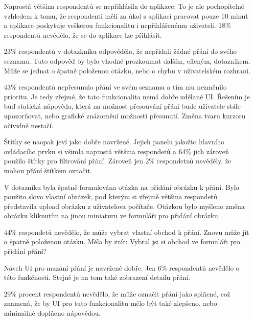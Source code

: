 Naprostá většína respondentů se nepřihlásila do aplikace. To je ale pochopitelné vzhledem k tomu, že respondenti měli za úkol s aplikací pracovat pouze 10 minut a aplikace poskytuje veškerou funkcionalitu i nepřihlášenému uživateli. 18\% respondentů nevědělo, že se do aplikace lze přihlásit.

23\% respondentů v dotazkníku odpovědělo, že nepřidali žádné přání do svého seznamu. Tuto odpověď by bylo vhodné prozkoumat dalším, cíleným, dotazníkem. Může se jednat o špatně položenou otázku, nebo o chybu v uživatelském rozhraní.

43\% respondentů nepřesunulo přání ve svém seznamu a tím mu nezměnilo prioritu. Je tedy zřejmé, že tato funkcionalita nemá dobře udělané UI. Řešením je buď statická nápověda, která na možnost přesouvání přání bude uživatele stále upozorňovat, nebo grafické znázornění možnosti přesunutí. Změna tvaru kurzoru očividně nestačí.

Štítky se naopak jeví jako dobře navržené. Jejich panelu jakožto hlavního ovládacího prvku si všimla naprostá většina respondetů a 64\% jich zároveň použilo štítky pro filtrování přání. Zároveň jen 2\% respondetnů nevěděly, že mohou přání štítkem označit.

V dotazníku byla špatně formulována otázka na přidání obrázku k přání. Bylo použito slovo vlastní obrázek, pod kterým si zřejmě většina respondetů představila upload obrázku z uživatelova počítače. Otázkou bylo myšleno změna obrázku kliknutím na jinou miniaturu ve formuláři pro přidání obrázku.

44\% respondetů nevědělo, že může vybrat vlastní obchod k přání. Znovu může jít o špatně položenou otázku. Měla by znít: Vybral jsi si obchod ve formuláři pro přidání přání?

Návrh UI pro mazání přání je navržené dobře. Jen 6\% respondentů nevědělo o této funkčnosti. Stejně je na tom také zobrazení detailu přání.

29\% procent respondentů nevědělo, že může označit přání jako splňené, což znamená, že by UI pro tuto funkcionalitu mělo být také zlepšeno, nebo minimálně doplňeno nápovědou.








